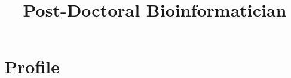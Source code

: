 \documentclass[11pt,a4paper,]{moderncv}
\title{Post-Doctoral Bioinformatician}
\begin{document}
\makecvtitle



\renewcommand*{\cventry}[7][-3mm]{%
  \cvitem[#1]{#2}{%
    {\bfseries#3}%
    \ifthenelse{\equal{#4}{}}{}{, {\slshape#4}}%
    \ifthenelse{\equal{#5}{}}{}{, #5}%
    \ifthenelse{\equal{#6}{}}{}{, #6}%
    .\strut%
    \ifx&#7&%
    \else{\newline{}\begin{minipage}[t]{\linewidth}\small#7\end{minipage}}\fi}}

\hypertarget{profile}{%
\section{Profile}\label{profile}}
\end{document}
